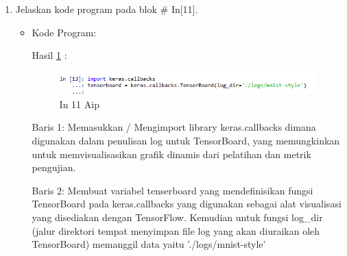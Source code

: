 \begin{enumerate}
\item Jelaskan kode program pada blok \# In[11].
\begin{itemize}
\item Kode Program:

\par Hasil \ref{in11aip} :
\begin{figure}[!hbtp]
\centering
\includegraphics[scale=0.7]{figures/AIP/prak11.PNG}
\caption{In 11 Aip}
\label{in11aip}
\end{figure}
\par Baris 1: Memasukkan / Mengimport library keras.callbacks dimana digunakan dalam penulisan log untuk TensorBoard, yang memungkinkan untuk memvisualisasikan grafik dinamis dari pelatihan dan metrik pengujian.
\par Baris 2: Membuat variabel tenserboard yang mendefinisikan fungsi TensorBoard pada keras.callbacks yang digunakan sebagai alat visualisasi yang disediakan dengan TensorFlow. Kemudian untuk fungsi log\_dir (jalur direktori tempat menyimpan file log yang akan diuraikan oleh TensorBoard) memanggil data yaitu './logs/mnist-style'
\end{itemize}
\par


\end{enumerate}
